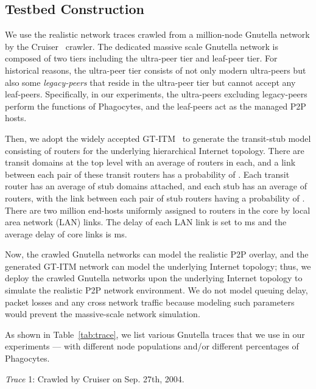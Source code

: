 \documentclass[times,10pt,twocolumn]{article}
\begin{document}
\subsection{Testbed Construction}






We use the realistic network traces crawled from a million-node
Gnutella network by the Cruiser~\cite{Characterizing:Stutzbach2005}
crawler. The dedicated massive scale Gnutella network is composed of
two tiers including the ultra-peer tier and leaf-peer tier. For
historical reasons, the ultra-peer tier consists of not only modern
ultra-peers but also some \emph{legacy-peers} that reside in the
ultra-peer tier but cannot accept any leaf-peers. Specifically, in
our experiments, the ultra-peers excluding legacy-peers perform the
functions of Phagocytes, and the leaf-peers act as the managed P2P
hosts.


Then, we adopt the widely accepted GT-ITM~\cite{zegura96how} to
generate the transit-stub model consisting of  routers for
the underlying hierarchical Internet topology. There are 
transit domains at the top level with an average of  routers in
each, and a link between each pair of these transit routers has a
probability of . Each transit router has an average of 
stub domains attached, and each stub has an average of  routers,
with the link between each pair of stub routers having a probability
of . There are two million end-hosts uniformly assigned to
routers in the core by local area network (LAN) links. The delay of
each LAN link is set to ms and the average delay of core links is
ms.


Now, the crawled Gnutella networks can model the realistic P2P
overlay, and the generated GT-ITM network can model the underlying
Internet topology; thus, we deploy the crawled Gnutella networks
upon the underlying Internet topology to simulate the realistic P2P
network environment. We do not model queuing delay, packet losses
and any cross network traffic because modeling such parameters would
prevent the massive-scale network simulation.








As shown in Table~\ref{tab:trace}, we list various Gnutella traces
that we use in our experiments --- with different node populations
and/or different percentages of Phagocytes.


 \emph{Trace} 1: Crawled by Cruiser on Sep. 27th, 2004.
\end{document}
